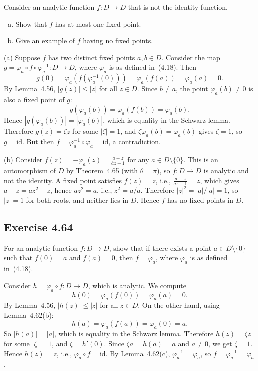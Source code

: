 \documentclass{article}
\begin{document}
Consider an analytic function $f : D \to D$ that is not the identity
function.
\begin{enumerate}[(a)]
  \item Show that $f$ has at most one fixed point.
  \item Give an example of $f$ having no fixed points.
\end{enumerate}

\begin{solution}
  (a) Suppose $f$ has two distinct fixed points $a, b \in D$.
  Consider the map $g = \varphi_a \circ f \circ \varphi_a^{-1} : D \to
  D$, where $\varphi_a$ is as defined in~(4.18). Then
  \[
    g(0) = \varphi_a(f(\varphi_a^{-1}(0))) = \varphi_a(f(a))
    = \varphi_a(a) = 0.
  \]
  By Lemma~4.56, $|g(z)| \le |z|$ for all $z \in D$. Since $b \ne a$,
  the point $\varphi_a(b) \ne 0$ is also a fixed point of $g$:
  \[
    g(\varphi_a(b)) = \varphi_a(f(b)) = \varphi_a(b).
  \]
  Hence $|g(\varphi_a(b))| = |\varphi_a(b)|$, which is equality in the
  Schwarz lemma. Therefore $g(z) = \zeta z$ for some $|\zeta| = 1$, and
  $\zeta \varphi_a(b) = \varphi_a(b)$ gives $\zeta = 1$, so
  $g = \mathrm{id}$. But then $f = \varphi_a^{-1} \circ \varphi_a =
  \mathrm{id}$, a contradiction.

  \medskip
  (b) Consider $f(z) = -\varphi_a(z) = \frac{a - z}{\bar{a}z - 1}$
  for any $a \in D \setminus \{0\}$.
  This is an automorphism of $D$ by Theorem~4.65 (with $\theta = \pi$),
  so $f : D \to D$ is analytic and not the identity.
  A fixed point satisfies $f(z) = z$, i.e.,
  $\frac{a - z}{\bar{a}z - 1} = z$, which gives
  $a - z = \bar{a}z^2 - z$, hence $\bar{a}z^2 = a$,
  i.e., $z^2 = a/\bar{a}$.
  Therefore $|z|^2 = |a|/|\bar{a}| = 1$, so $|z| = 1$ for both roots,
  and neither lies in $D$.
  Hence $f$ has no fixed points in $D$.
\end{solution}

\subsection{Exercise 4.64}
\label{sec:ca-ex-4-64}

For an analytic function $f : D \to D$, show that if there exists a
point $a \in D \setminus \{0\}$ such that $f(0) = a$ and $f(a) = 0$,
then $f = \varphi_a$, where $\varphi_a$ is as defined in~(4.18).

\begin{solution}
  Consider $h = \varphi_a \circ f : D \to D$, which is analytic.
  We compute
  \[
    h(0) = \varphi_a(f(0)) = \varphi_a(a) = 0.
  \]
  By Lemma~4.56, $|h(z)| \le |z|$ for all $z \in D$. On the other
  hand, using Lemma~4.62(b):
  \[
    h(a) = \varphi_a(f(a)) = \varphi_a(0) = a.
  \]
  So $|h(a)| = |a|$, which is equality in the Schwarz lemma. Therefore
  $h(z) = \zeta z$ for some $|\zeta| = 1$, and $\zeta = h'(0)$.
  Since $\zeta a = h(a) = a$ and $a \ne 0$, we get $\zeta = 1$.
  Hence $h(z) = z$, i.e., $\varphi_a \circ f = \mathrm{id}$.
  By Lemma~4.62(c), $\varphi_a^{-1} = \varphi_a$, so
  $f = \varphi_a^{-1} = \varphi_a$.
\end{solution}
\end{document}
